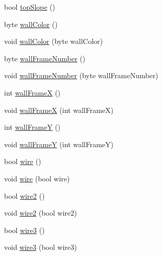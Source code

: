 \begin{DoxyCompactItemize}
bool \hyperlink{classOTA_1_1Memory_1_1MemTile_ac043db1624acb340478b6138d4c8f15b}{top\+Slope} ()
\item 
byte \hyperlink{classOTA_1_1Memory_1_1MemTile_a733a46553d5db455076acbf04be80353}{wall\+Color} ()
\item 
void \hyperlink{classOTA_1_1Memory_1_1MemTile_aa83ec3631df15170093e2cdd61b0a3e4}{wall\+Color} (byte wall\+Color)
\item 
byte \hyperlink{classOTA_1_1Memory_1_1MemTile_ad42543e9700afbdc30108b68f0082bae}{wall\+Frame\+Number} ()
\item 
void \hyperlink{classOTA_1_1Memory_1_1MemTile_a16524ab10b87e609d1de246c2d435bc2}{wall\+Frame\+Number} (byte wall\+Frame\+Number)
\item 
int \hyperlink{classOTA_1_1Memory_1_1MemTile_aee295e9d8e984b667be9bafcb718e3df}{wall\+Frame\+X} ()
\item 
void \hyperlink{classOTA_1_1Memory_1_1MemTile_a6ada02b141b379a93d151a74825686bc}{wall\+Frame\+X} (int wall\+Frame\+X)
\item 
int \hyperlink{classOTA_1_1Memory_1_1MemTile_a85f241160f8acce52f06cb87117e2bfa}{wall\+Frame\+Y} ()
\item 
void \hyperlink{classOTA_1_1Memory_1_1MemTile_a1a5b6aecd3db981ad74b68328af39c01}{wall\+Frame\+Y} (int wall\+Frame\+Y)
\item 
bool \hyperlink{classOTA_1_1Memory_1_1MemTile_a26b8d24a33f15a77d79983138f1188ed}{wire} ()
\item 
void \hyperlink{classOTA_1_1Memory_1_1MemTile_a2f74c2588fbe6fe5a01e4018ac7960f7}{wire} (bool wire)
\item 
bool \hyperlink{classOTA_1_1Memory_1_1MemTile_ac0f2c51337dfac33fde8443bb69dc659}{wire2} ()
\item 
void \hyperlink{classOTA_1_1Memory_1_1MemTile_a3b4bbaceb118d54ca4d253bd49caf42d}{wire2} (bool wire2)
\item 
bool \hyperlink{classOTA_1_1Memory_1_1MemTile_ae5d5c4ff0b0137e77bf062545e377662}{wire3} ()
\item 
void \hyperlink{classOTA_1_1Memory_1_1MemTile_ab04fed924401d2f283e0280a834e81b0}{wire3} (bool wire3)
\end{DoxyCompactItemize}
